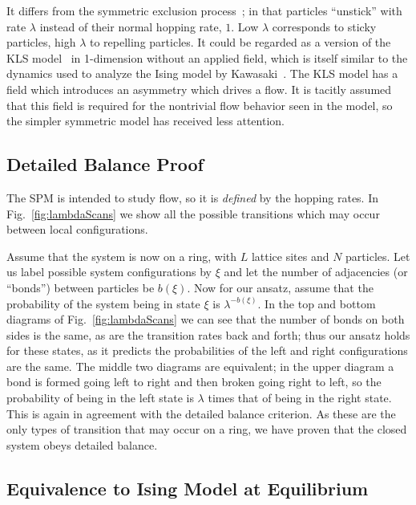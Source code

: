 \documentclass[
reprint, amsmath,amssymb, aps,
]{revtex4-1}
\begin{document}
It differs from the symmetric exclusion
process~\cite{sugden2007dynamically, Kollmann2003, Lin2005,
  Hegde2014,Krapivsky2014, Imamura2017}; in that particles ``unstick''
with rate $\lambda$ instead of their normal hopping rate, $1$.  Low
$\lambda$ corresponds to sticky particles, high $\lambda$ to repelling
particles.
It could be regarded as a version of the KLS model~\cite{Katz1984,
  Zia2010, Kafri2003} in 1-dimension without an applied field, which
is itself similar to the dynamics used to analyze the Ising model by
Kawasaki~\cite{PhysRev.145.224}.  The KLS model has a field which
introduces an asymmetry which drives a flow.  It is tacitly assumed
that this field is required for the nontrivial flow behavior seen in
the model, so the simpler symmetric model has received less attention.


\subsection{Detailed Balance Proof} 
The SPM is intended to study flow, so it is {\it defined} by the
hopping rates.  In Fig.~\ref{fig:lambdaScans} we
show all the possible transitions which may occur between local
configurations. 

Assume that the system is now on a ring, with $L$
lattice sites and $N$ particles.  Let us label possible system
configurations by $\xi$ and let the number of adjacencies (or
``bonds'') between particles be $b(\xi)$. Now for our ansatz, assume
that the probability of the system being in state $\xi$ is
$\lambda^{-b(\xi)}$.  In the top and bottom diagrams of
Fig.~\ref{fig:lambdaScans} we can see that the number of bonds on
both sides is the same, as are the transition rates back and forth;
thus our ansatz holds for these states, as it predicts the
probabilities of the left and right configurations are the same. The
middle two diagrams are equivalent; in the upper diagram a
bond is formed going left to right and then broken going right to
left, so the probability of being in the left state is $\lambda$ times
that of being in the right state. This is again in agreement with the
detailed balance criterion. As these are the only types of transition
that may occur on a ring, we have proven that the closed system obeys
detailed balance.

\subsection{Equivalence to Ising Model at Equilibrium}
\end{document}
